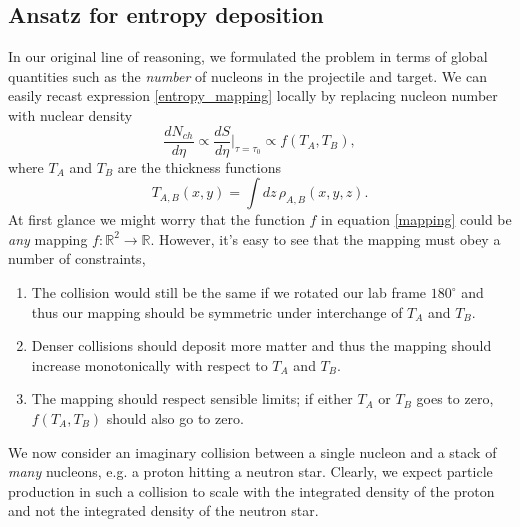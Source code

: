 \documentclass[aps,prc,reprint,amsmath,nofootinbib]{revtex4-1}
\begin{document}
\subsection{Ansatz for entropy deposition}

In our original line of reasoning, we formulated the problem in terms of global quantities such as the \emph{number} of nucleons in the projectile and target.
We can easily recast expression \ref{entropy_mapping} locally by replacing nucleon number with nuclear density
\begin{equation}
 \label{mapping}
 \frac{dN_{ch}}{d\eta} \propto \frac{dS}{d\eta} \bigg|_{\tau=\tau_0} \propto f(T_A,T_B),
\end{equation}
where $T_A$ and $T_B$ are the thickness functions
\begin{equation}
 T_{A,B}(x,y) = \int dz\, \rho_{A,B}(x,y,z).
\end{equation}
At first glance we might worry that the function $f$ in equation \ref{mapping} could be \emph{any} mapping $f:\mathbb{R}^2 \rightarrow \mathbb{R}$. However, it's easy to see that the mapping
must obey a number of constraints,
\begin{enumerate}
 \item The collision would still be the same if we rotated our lab frame $180^{\circ}$ and thus our mapping should be symmetric under interchange of $T_A$ and $T_B$.
 \item Denser collisions should deposit more matter and thus the mapping should increase monotonically with respect to $T_A$ and $T_B$.
 \item The mapping should respect sensible limits; if either $T_A$ or $T_B$ goes to zero, $f(T_A,T_B)$ should also go to zero.
\end{enumerate}

We now consider an imaginary collision between a single nucleon and a stack of \emph{many} nucleons, e.g. a proton hitting a neutron star. Clearly, we expect particle
production in such a collision to scale with the integrated density of the proton and not the integrated density of the neutron star. 
\end{document}
